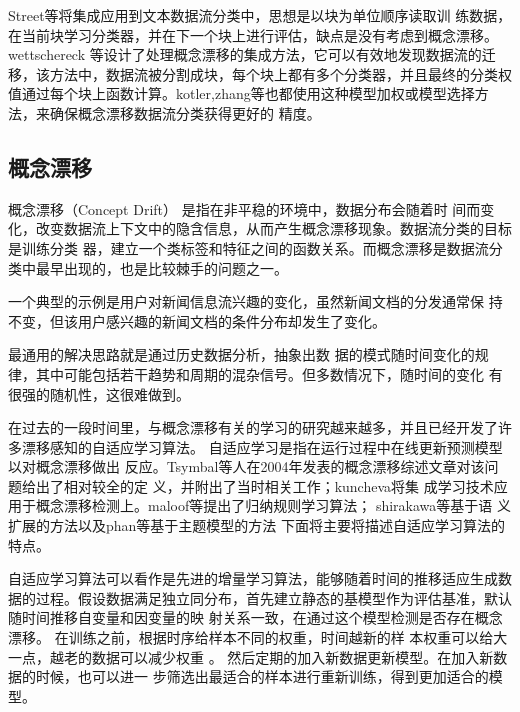 Street等\cite{street2001streaming}将集成应用到文本数据流分类中，思想是以块为单位顺序读取训
练数据，在当前块学习分类器，并在下一个块上进行评估，缺点是没有考虑到概念漂移。wettschereck
等\cite{wettschereck2003mining}设计了处理概念漂移的集成方法，它可以有效地发现数据流的迁移，该方法中，数据流被分割成块，每个块上都有多个分类器，并且最终的分类权值通过每个块上函数计算。kotler,zhang等\cite{kotler2003dynamic,zhang2009mining}也都使用这种模型加权或模型选择方法，来确保概念漂移数据流分类获得更好的
精度。

\subsection{概念漂移}
概念漂移（Concept Drift）\cite{widmer1996learning} 是指在非平稳的环境中，数据分布会随着时
间而变化，改变数据流上下文中的隐含信息，从而产生概念漂移现象。数据流分类的目标是训练分类
器，建立一个类标签和特征之间的函数关系。而概念漂移是数据流分类中最早出现的，也是比较棘手的问题之一。
  
一个典型的示例是用户对新闻信息流兴趣的变化，虽然新闻文档的分发通常保
 持不变，但该用户感兴趣的新闻文档的条件分布却发生了变化。

最通用的解决思路就是通过历史数据分析，抽象出数                             据的模式随时间变化的规律，其中可能包括若干趋势和周期的混杂信号。但多数情况下，随时间的变化
有很强的随机性，这很难做到。

在过去的一段时间里，与概念漂移有关的学习的研究越来越多，并且已经开发了许多漂移感知的自适应学习算法。
自适应学习是指在运行过程中在线更新预测模型以对概念漂移做出
反应。Tsymbal等人在2004年发表的概念漂移综述文章\cite{tsymbal2004problem}对该问题给出了相对较全的定
义，并附出了当时相关工作；kuncheva\cite{kuncheva2004classifier,kuncheva2008classifier}将集
成学习技术应用于概念漂移检测上。maloof等提出了归纳规则学习算法\cite{maloof2010aq}；
shirakawa等基于语
义扩展的方法\cite{shirakawa2015wikipedia}以及phan等基于主题模型的方法\cite{phan2010hidden}
下面将主要将描述自适应学习算法的特点。

自适应学习算法可以看作是先进的增量学习算法，能够随着时间的推移适应生成数据的过程。假设数据满足独立同分布，首先建立静态的基模型作为评估基准，默认随时间推移自变量和因变量的映
射关系一致，在通过这个模型检测是否存在概念漂移。
在训练之前，根据时序给样本不同的权重，时间越新的样
本权重可以给大一点，越老的数据可以减少权重                                      。
然后定期的加入新数据更新模型。在加入新数据的时候，也可以进一
步筛选出最适合的样本进行重新训练，得到更加适合的模型。


